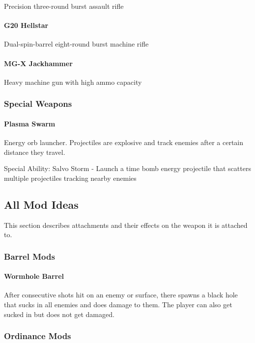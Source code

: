 \documentclass[../Main.tex]{subfiles}
\begin{document}
Precision three-round burst assault rifle

\paragraph{G20 Hellstar}

Dual-spin-barrel eight-round burst machine rifle

\paragraph{MG-X Jackhammer}

Heavy machine gun with high ammo capacity

\subsubsection{Special Weapons}

\paragraph{Plasma Swarm}

Energy orb launcher. Projectiles are explosive and track enemies after a certain distance they travel. 

Special Ability: Salvo Storm - Launch a time bomb energy projectile that scatters multiple projectiles tracking nearby enemies

\subsection{All Mod Ideas}

This section describes attachments and their effects on the weapon it is attached to.

\subsubsection{Barrel Mods}

\paragraph{Wormhole Barrel}

After consecutive shots hit on an enemy or surface, there spawns a black hole that sucks in all enemies and does damage to them. The player can also get sucked in but does not get damaged. 

\subsubsection{Ordinance Mods}
\end{document}
